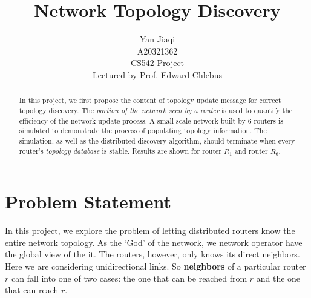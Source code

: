 \documentclass[12pt]{article}  %
\title{Network Topology Discovery}
\author{Yan Jiaqi\\
A20321362\\
CS542 Project\\
Lectured by Prof. Edward Chlebus}
\theoremstyle{definition}
\theoremstyle{remark}
\begin{document}
\maketitle

\begin{abstract}
In this project, we first propose the content of topology update message for correct topology discovery.
The \textit{portion of the network seen by a router} is used to quantify the efficiency of the network update process.
A small scale network built by 6 routers is simulated to demonstrate the process of populating topology information.
The simulation, as well as the distributed discovery algorithm, should terminate when every router's \textit{topology database} is stable.
Results are shown for router $R_1$ and router $R_6$.
\end{abstract}

\newpage                     %
\tableofcontents

\newpage                     %
\section{Problem Statement}\label{s:intro}
%

In this project, we explore the problem of letting distributed routers know the entire network topology.
As the `God' of the network, we network operator have the global view of the it.
The routers, however, only knows its direct neighbors. 
Here we are considering unidirectional links.
So \textbf{neighbors} of a particular router $r$ can fall into one of two cases: the one that can be reached from $r$ and the one that can reach $r$.
\end{document}
